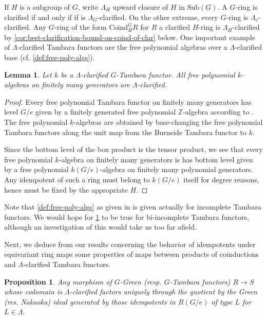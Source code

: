 \documentclass[11pt,dvipsnames]{amsart}
\newtheorem{lemma}[theorem]{Lemma}
\newtheorem{proposition}[theorem]{Proposition}
\theoremstyle{BoldRemark}
\begin{document}
If $H$ is a subgroup of $G$, write $\Lambda_H$ upward closure of $H$ in $\mathrm{Sub}(G)$. A $G$-ring is clarified if and only if if is $\Lambda_G$-clarified. On the other extreme, every $G$-ring is $\Lambda_e$-clarified. Any $G$-ring of the form $\mathrm{Coind}_H^G R$ for $R$ a clarified $H$-ring is $\Lambda_H$-clarified by \cref{cor:best-clarification-bound-on-coind-of-clar} below. One important example of $\Lambda$-clarified Tambara functors are the free polynomial algebras over a $\Lambda$-clarified base (cf. \cref{def:free-poly-algs}).

\begin{lemma}\label{lem:free-poly-k-algs-are-clarified}
	Let $k$ be a $\Lambda$-clarified $G$-Tambara functor. All free polynomial $k$-algebras on finitely many generators are $\Lambda$-clarified.
\end{lemma}

\begin{proof}
	Every free polynomial Tambara functor on finitely many generators has level $G/e$ given by a finitely generated free polynomial $\mathbb{Z}$-algebra according to \cite[Theorem A]{Bru05}. The free polynomial $k$-algebras are obtained by base-changing the free polynomial Tambara functors along the unit map from the Burnside Tambara functor to $k$.
	
	Since the bottom level of the box product is the tensor product, we see that every free polynomial $k$-algebra on finitely many generators is has bottom level given by a free polynomial $k(G/e)$-algebra on finitely many polynomial generators. Any idempotent of such a ring must belong to $k(G/e)$ itself for degree reasons, hence must be fixed by the appropriate $H$.
\end{proof}

Note that \cref{def:free-poly-algs} as given in \cite{BH18} is given actually for incomplete Tambara functors. We would hope for \cref{lem:free-poly-k-algs-are-clarified} to be true for bi-incomplete Tambara functors, although an investigation of this would take us too far afield.

Next, we deduce from our results concerning the behavior of idempotents under equivariant ring maps some properties of maps between products of coinductions and $\Lambda$-clarified Tambara functors.

\begin{proposition}\label{prop:map-into-clarified-uniquely-factors-through-quotient}
	Any morphism of $G$-Green (resp. $G$-Tambara functors) $R \rightarrow S$ whose codomain is $\Lambda$-clarified factors uniquely through the quotient by the Green (res. Nakaoka) ideal generated by those idempotents in $R(G/e)$ of type $L$ for $L \in \Lambda$.
\end{proposition}
\end{document}
